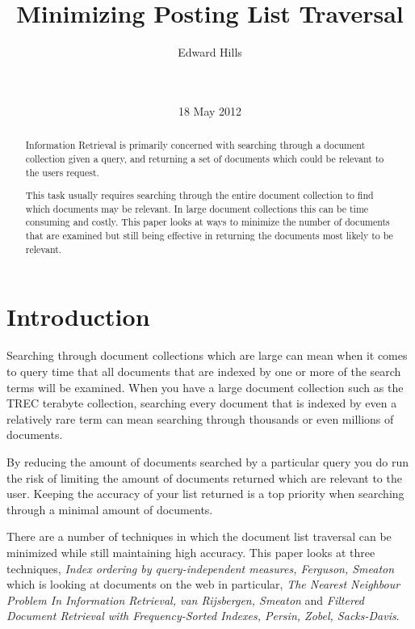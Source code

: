 \documentclass{acm_proc_article-sp}
\begin{document}
\title{Minimizing Posting List Traversal}

\author{
\alignauthor
Edward Hills\\\\
       \\
       }
\date{18 May 2012}

\maketitle
\begin{abstract}

Information Retrieval is primarily concerned with searching through a document collection given a query, and returning a set of documents which could be relevant to the users request. 

This task usually requires searching through the entire document collection to find which documents may be relevant. In large document collections this can be time consuming and costly. This paper looks at ways to minimize the number of documents that are examined but still being effective in returning the documents most likely to be relevant.

\end{abstract}

\section{Introduction}

Searching through document collections which are large can mean when it comes to query time that all documents that are indexed by one or more of the search terms will be examined. When you have a large document collection such as the TREC terabyte collection, searching every document that is indexed by even a relatively rare term can mean searching through thousands or even millions of documents.

By reducing the amount of documents searched by a particular query you do run the risk of limiting the amount of documents returned which are relevant to the user. Keeping the accuracy of your list returned is a top priority when searching through a minimal amount of documents. 

There are a number of techniques in which the document list traversal can be minimized while still maintaining high accuracy. This paper looks at three techniques, \emph{Index ordering by query-independent measures, Ferguson, Smeaton} which is looking at documents on the web in particular, \emph{The Nearest Neighbour Problem In Information Retrieval, van Rijsbergen, Smeaton} and \emph{Filtered Document Retrieval with Frequency-Sorted Indexes, Persin, Zobel, Sacks-Davis}. 
\end{document}
